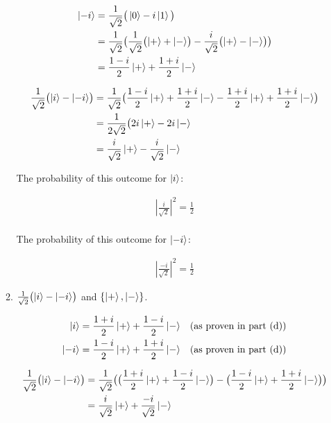 \documentclass{article}
\begin{document}
\begin{enumerate}
\begin{enumerate}
\begin{align*}
	\ket{-i} &= \frac{1}{\sqrt{2}} \bigr(\ket{0} - i\ket{1} \bigl) \\
	&= \frac{1}{\sqrt{2}} \bigl(\frac{1}{\sqrt{2}} \bigl(\ket{+} + \ket{-} \bigr) - \frac{i}{\sqrt{2}} \bigl(\ket{+} - \ket{-} \bigr) \bigr) \\
	&= \frac{1 - i}{2}\ket{+} + \frac{1 + i}{2} \ket{-}
\end{align*}

\begin{align*}
	\frac{1}{\sqrt{2}} \bigl(\ket{i} - \ket{-i} \bigr) &= \frac{1}{\sqrt{2}} \bigl(\frac{1 - i}{2}\ket{+} + \frac{1 + i}{2} \ket{-} - \frac{1 + i}{2}\ket{+} + \frac{1 + i}{2} \ket{-}\bigr) \\
	&= \frac{1}{2\sqrt{2}} \bigl(2i\ket{+} - 2i \ket{-} \\
	& = \frac{i}{\sqrt{2}}\ket{+} - \frac{i}{\sqrt{2}}\ket{-}
\end{align*}

The probability of this outcome for $\ket{i}$:

\begin{align*}
  |\frac{i}{\sqrt{2}}|^2 = \frac{1}{2} \\
\end{align*}

The probability of this outcome for $\ket{-i}$:

\begin{align*}
  |\frac{-i}{\sqrt{2}}|^2 = \frac{1}{2}
\end{align*}

		\item $\frac{1}{\sqrt{2}} \bigl(\ket{i} - \ket{-i}\bigr)$ and $\{\ket{+}, \ket{-}\}$.


\begin{align*}
	\ket{i} = \frac{1 + i}{2}\ket{+} + \frac{1 - i}{2} \ket{-} &&\text{(as proven in part (d))} \\
	\ket{-i} = \frac{1 - i}{2}\ket{+} + \frac{1 + i}{2} \ket{-} &&\text{(as proven in part (d))}
\end{align*}

\begin{align*}
	\frac{1}{\sqrt{2}} \bigl( \ket{i} - \ket{-i} \bigr) &= \frac{1}{\sqrt{2}} \bigl( \bigl( \frac{1 + i}{2} \ket{+} + \frac{1 - i}{2} \ket{-} \bigr) - \bigl( \frac{1 - i}{2} \ket{+} + \frac{1 + i}{2} \ket{-} \bigr) \bigr) \\
	&= \frac{i}{\sqrt{2}} \ket{+} + \frac{-i}{\sqrt{2}} \ket{-}
\end{align*}


\end{enumerate}
\end{enumerate}
\end{document}
